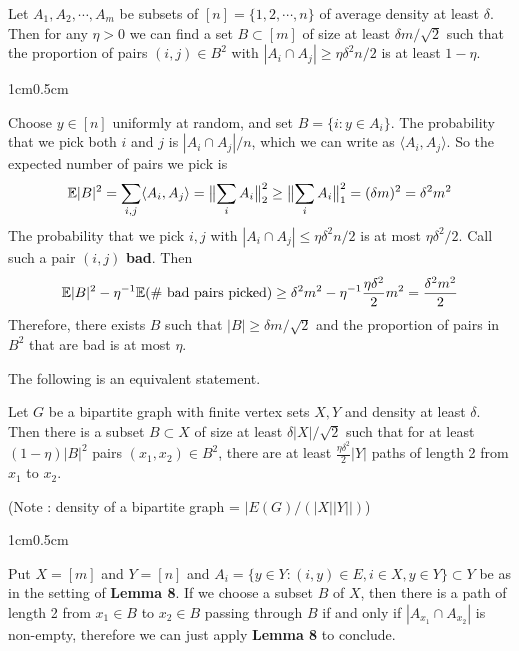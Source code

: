 \documentclass[10pt,a4paper]{report}
\newenvironment{proof}
{\begin{changemargin}{1cm}{0.5cm}
	}%
	{\end{changemargin}
}
\begin{document}
 Let $A_1, A_2,\cdots, A_m$ be subsets of $[n]=\{1,2,\cdots,n\}$ of average density at least $\delta$. Then for any $\eta >0$ we can find a set $B \subset [m]$ of size at least $\delta m/\sqrt{2}$ such that the proportion of pairs $(i,j) \in B^2$ with $|A_i \cap A_j| \geq \eta \delta^2 n/2$ is at least $1-\eta$.
\begin{proof}
\pf Choose $y\in [n]$ uniformly at random, and set $B = \{i: y\in A_i \}$. The probability that we pick both $i$ and $j$ is $|A_i \cap A_j|/n$, which we can write as $\langle A_i, A_j \rangle$. So the expected number of pairs we pick is 
\begin{align*}
\mathbb{E}|B|^2 = \sum_{i,j} \langle A_i, A_j \rangle = \bigl\lVert\sum_i A_i\bigr\rVert_{2}^2 \geq \bigl\lVert\sum_i A_i\bigr\rVert_{1}^2 =(\delta m)^2 = \delta^2 m^2
\end{align*}
The probability that we pick $i,j$ with $|A_i \cap A_j| \leq \eta \delta^2 n/2$ is at most $\eta \delta^2 /2$. Call such a pair $(i,j)$ \textbf{bad}. Then
\begin{align*}
\mathbb{E} |B|^2 - \eta^{-1} \mathbb{E}(\# \text{ bad pairs picked}) \geq \delta^2 m^2 - \eta^{-1} \frac{\eta \delta^2}{2} m^2 = \frac{\delta^2 m^2}{2}
\end{align*}
Therefore, there exists $B$ such that $|B|\geq \delta m/\sqrt{2}$ and the proportion of pairs in $B^2$ that are bad is at most $\eta$.

\eop
\end{proof}
\s

The following is an equivalent statement.
\s

 Let $G$ be a bipartite graph with finite vertex sets $X,Y$ and density at least $\delta$. Then there is a subset $B\subset X$ of size at least $\delta |X| /\sqrt{2}$ such that for at least $(1-\eta)|B|^2$ pairs $(x_1,x_2)\in B^2$, there are at least $\frac{\eta \delta^2}{2} |Y|$ paths of length 2 from $x_1$ to $x_2$. 

(Note : density of a bipartite graph = $|E(G)/(|X||Y||)$)
\begin{proof}
\pf Put $X =[m]$ and $Y= [n]$ and $A_i = \{y\in Y : (i,y) \in E, i\in X, y\in Y \} \subset Y $ be as in the setting of \textbf{Lemma 8}. If we choose a subset $B$ of $X$, then there is a path of length 2 from $x_1 \in B$ to $x_2 \in B$ passing through $B$ if and only if $|A_{x_1}\cap A_{x_2}|$ is non-empty, therefore we can just apply \textbf{Lemma 8} to conclude.

\eop
\end{proof}
\end{document}
